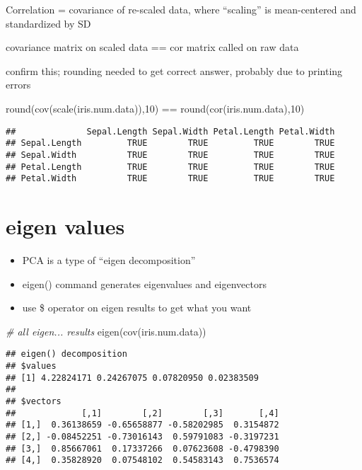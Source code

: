 \documentclass[
]{book}
\newenvironment{Shaded}{\begin{snugshade}}{\end{snugshade}}
\newcommand{\CommentTok}[1]{\textcolor[rgb]{0.56,0.35,0.01}{\textit{#1}}}
\newcommand{\DecValTok}[1]{\textcolor[rgb]{0.00,0.00,0.81}{#1}}
\newcommand{\FunctionTok}[1]{\textcolor[rgb]{0.00,0.00,0.00}{#1}}
\newcommand{\NormalTok}[1]{#1}
\newcommand{\SpecialCharTok}[1]{\textcolor[rgb]{0.00,0.00,0.00}{#1}}
\providecommand{\tightlist}{%
  \setlength{\itemsep}{0pt}\setlength{\parskip}{0pt}}
\begin{document}
Correlation = covariance of re-scaled data, where ``scaling'' is mean-centered and standardized by SD

covariance matrix on scaled data == cor matrix called on raw data

confirm this; rounding needed to get correct answer, probably due to printing errors

\begin{Shaded}
\begin{Highlighting}[]
\FunctionTok{round}\NormalTok{(}\FunctionTok{cov}\NormalTok{(}\FunctionTok{scale}\NormalTok{(iris.num.data)),}\DecValTok{10}\NormalTok{) }\SpecialCharTok{==} 
  \FunctionTok{round}\NormalTok{(}\FunctionTok{cor}\NormalTok{(iris.num.data),}\DecValTok{10}\NormalTok{)}
\end{Highlighting}
\end{Shaded}

\begin{verbatim}
##              Sepal.Length Sepal.Width Petal.Length Petal.Width
## Sepal.Length         TRUE        TRUE         TRUE        TRUE
## Sepal.Width          TRUE        TRUE         TRUE        TRUE
## Petal.Length         TRUE        TRUE         TRUE        TRUE
## Petal.Width          TRUE        TRUE         TRUE        TRUE
\end{verbatim}

\hypertarget{eigen-values}{%
\chapter{eigen values}\label{eigen-values}}

\begin{itemize}
\tightlist
\item
  PCA is a type of ``eigen decomposition''
\item
  eigen() command generates eigenvalues and eigenvectors
\item
  use \$ operator on eigen results to get what you want
\end{itemize}

\begin{Shaded}
\begin{Highlighting}[]
\CommentTok{\# all eigen... results}
\FunctionTok{eigen}\NormalTok{(}\FunctionTok{cov}\NormalTok{(iris.num.data))}
\end{Highlighting}
\end{Shaded}

\begin{verbatim}
## eigen() decomposition
## $values
## [1] 4.22824171 0.24267075 0.07820950 0.02383509
## 
## $vectors
##             [,1]        [,2]        [,3]       [,4]
## [1,]  0.36138659 -0.65658877 -0.58202985  0.3154872
## [2,] -0.08452251 -0.73016143  0.59791083 -0.3197231
## [3,]  0.85667061  0.17337266  0.07623608 -0.4798390
## [4,]  0.35828920  0.07548102  0.54583143  0.7536574
\end{verbatim}
\end{document}

